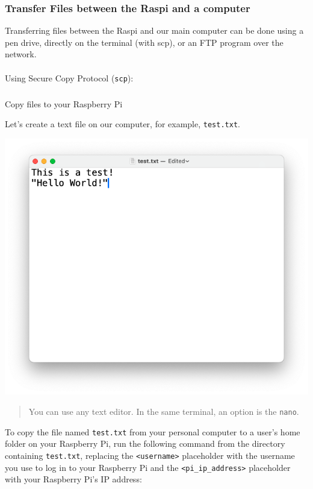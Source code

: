 \documentclass[
]{article}
\makeatletter
\let\oldparagraph\paragraph
\renewcommand{\paragraph}{
    \@ifstar
      \xxxParagraphStar
      \xxxParagraphNoStar
  }
\newcommand{\xxxParagraphStar}[1]{\oldparagraph*{#1}\mbox{}}
\newcommand{\xxxParagraphNoStar}[1]{\oldparagraph{#1}\mbox{}}
\let\oldsubparagraph\subparagraph
\renewcommand{\subparagraph}{
    \@ifstar
      \xxxSubParagraphStar
      \xxxSubParagraphNoStar
  }
\newcommand{\xxxSubParagraphStar}[1]{\oldsubparagraph*{#1}\mbox{}}
\newcommand{\xxxSubParagraphNoStar}[1]{\oldsubparagraph{#1}\mbox{}}
\makeatother
\begin{document}
\subsubsection{Transfer Files between the Raspi and a
computer}\label{sec-setup-transfer-files-raspi-computer-77e4}

Transferring files between the Raspi and our main computer can be done
using a pen drive, directly on the terminal (with scp), or an FTP
program over the network.

\paragraph{\texorpdfstring{Using Secure Copy Protocol
(\texttt{scp}):}{Using Secure Copy Protocol (scp):}}\label{sec-setup-using-secure-copy-protocol-scp-310d}

\subparagraph{Copy files to your Raspberry
Pi}\label{sec-setup-copy-files-raspberry-pi-1a8b}

Let's create a text file on our computer, for example,
\texttt{test.txt}.

\noindent \begin{center}
\includegraphics[width=0.7\linewidth,height=\textheight,keepaspectratio]{images/png/test_txt.png}
\end{center}

\begin{quote}
You can use any text editor. In the same terminal, an option is the
\texttt{nano}.
\end{quote}

To copy the file named \texttt{test.txt} from your personal computer to
a user's home folder on your Raspberry Pi, run the following command
from the directory containing \texttt{test.txt}, replacing the
\texttt{\textless{}username\textgreater{}} placeholder with the username
you use to log in to your Raspberry Pi and the
\texttt{\textless{}pi\_ip\_address\textgreater{}} placeholder with your
Raspberry Pi's IP address:
\end{document}
